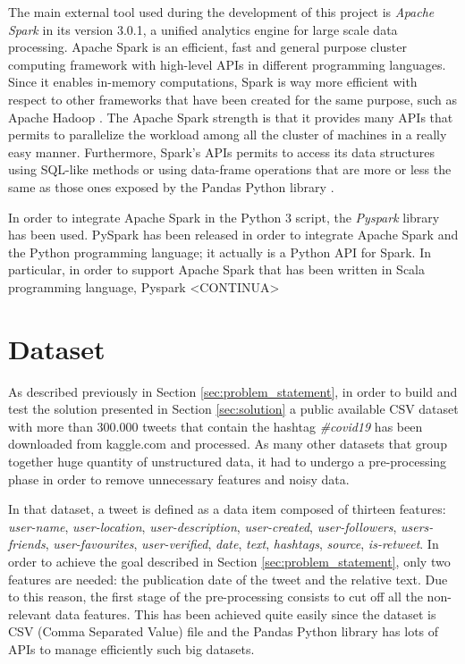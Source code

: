 The main external tool used during the development of this project is \textit{Apache Spark} \cite{spark-reference} in its version 3.0.1, a unified analytics engine for large scale data processing. Apache Spark is an efficient, fast and general purpose cluster computing framework with high-level APIs in different programming languages. Since it enables in-memory computations, Spark is way more efficient with respect to other frameworks that have been created for the same purpose, such as Apache Hadoop \cite{hadoop-reference}. The Apache Spark strength is that it provides many APIs that permits to parallelize the workload among all the cluster of machines in a really easy manner. Furthermore, Spark's APIs permits to access its data structures using SQL-like methods or using data-frame operations that are more or less the same as those ones exposed by the Pandas Python library \cite{python-pandas}.

In order to integrate Apache Spark in the Python 3 script, the \textit{Pyspark} library \cite{pyspark-reference} has been used. PySpark has been released in order to integrate Apache Spark and the Python programming language; it actually is a Python API for Spark. In particular, in order to support Apache Spark that has been written in Scala programming language, Pyspark <CONTINUA>

\section{Dataset}
\label{sec:dataset}
As described previously in Section \ref{sec:problem_statement}, in order to build and test the solution presented in Section \ref{sec:solution} a public available CSV dataset with more than 300.000 tweets that contain the hashtag \textit{\#covid19} \cite{covid19-tweets-dataset} has been downloaded from kaggle.com and processed. As many other datasets that group together huge quantity of unstructured data, it had to undergo a pre-processing phase in order to remove unnecessary features and noisy data. 

In that dataset, a tweet is defined as a data item composed of thirteen features: \textit{user-name}, \textit{user-location}, \textit{user-description}, \textit{user-created}, \textit{user-followers}, \textit{users-friends}, \textit{user-favourites}, \textit{user-verified}, \textit{date}, \textit{text}, \textit{hashtags}, \textit{source}, \textit{is-retweet}. In order to achieve the goal described in Section \ref{sec:problem_statement}, only two features are needed: the publication date of the tweet and the relative text. Due to this reason, the first stage of the pre-processing consists to cut off all the non-relevant data features. This has been achieved quite easily since the dataset is CSV (Comma Separated Value) file and the Pandas Python library \cite{python-pandas} has lots of APIs to manage efficiently such big datasets.

